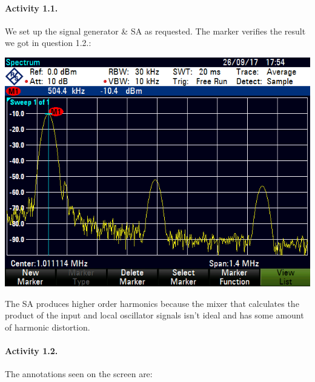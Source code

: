 



\startpage
\paragraph{Activity	1.1.}

We set up the signal generator \& SA as requested. The marker verifies
the result we got in question 1.2.:

\includegraphics[width=\textwidth]{assets/1-1}

The SA produces higher order harmonics because the mixer that calculates the
product of the input and local oscillator signals isn't ideal and has some
amount of harmonic distortion.

\finishpage


\startpage
\paragraph{Activity 1.2.}

The annotations seen on the screen are:

